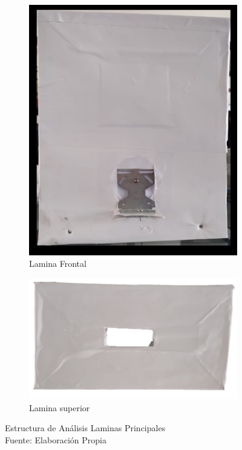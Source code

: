 \begin{figure}[h!]
	\centering
	\begin{subfigure}{0.47\linewidth}
		\centering
		\includegraphics[scale=0.3]{Figs/300.png}
		\caption{Lamina Frontal}
		\label{fig:frontal}
	\end{subfigure}
	\begin{subfigure}{0.47\linewidth}
		\centering
		\includegraphics[scale=0.5]{Figs/301.png}
		\caption{Lamina superior}
		\label{fig:superior}
	\end{subfigure}
	\caption{Estructura de Análisis Laminas Principales\\
		Fuente: Elaboración Propia}
	\label{fig:estructura}
\end{figure} 

